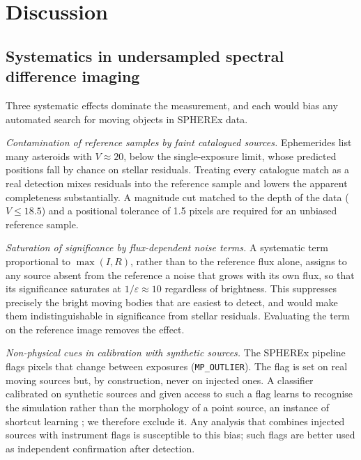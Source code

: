 \documentclass[twocolumn,linenumbers]{aastex702}
\begin{document}
\section{Discussion}\label{sec:discussion}

\subsection{Systematics in undersampled spectral difference imaging}\label{sec:sys}
Three systematic effects dominate the measurement, and each would bias any automated search for moving objects in SPHEREx data.

\emph{Contamination of reference samples by faint catalogued sources.} Ephemerides list many asteroids with $V \approx 20$, below the single-exposure limit, whose predicted positions fall by chance on stellar residuals. Treating every catalogue match as a real detection mixes residuals into the reference sample and lowers the apparent completeness substantially. A magnitude cut matched to the depth of the data ($V \le 18.5$) and a positional tolerance of 1.5 pixels are required for an unbiased reference sample.

\emph{Saturation of significance by flux-dependent noise terms.} A systematic term proportional to $\max(I, R)$, rather than to the reference flux alone, assigns to any source absent from the reference a noise that grows with its own flux, so that its significance saturates at $1/\varepsilon \approx 10$ regardless of brightness. This suppresses precisely the bright moving bodies that are easiest to detect, and would make them indistinguishable in significance from stellar residuals. Evaluating the term on the reference image removes the effect.

\emph{Non-physical cues in calibration with synthetic sources.} The SPHEREx pipeline flags pixels that change between exposures (\texttt{MP\_OUTLIER}). The flag is set on real moving sources but, by construction, never on injected ones. A classifier calibrated on synthetic sources and given access to such a flag learns to recognise the simulation rather than the morphology of a point source, an instance of shortcut learning \citep{geirhos20}; we therefore exclude it. Any analysis that combines injected sources with instrument flags is susceptible to this bias; such flags are better used as independent confirmation after detection.
\end{document}
